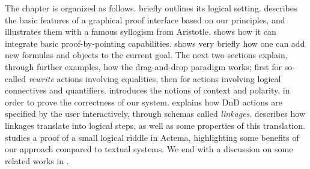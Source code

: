 The chapter is organized as follows.  briefly outlines
its logical setting.  describes the basic features of
a graphical proof interface based on our principles, and illustrates them with a
famous syllogism from Aristotle.  shows how it can
integrate basic proof-by-pointing capabilities.  shows
very briefly how one can add new formulas and objects to the current goal. The
next two sections explain, through further examples, how the drag-and-drop
paradigm works; first for so-called \emph{rewrite} actions involving equalities,
then for actions involving logical connectives and quantifiers.
 introduces the notions of context and polarity, in
order to prove the correctness of our system. 
explains how DnD actions are specified by the user interactively, through
schemas called \emph{linkages}.  describes how linkages
translate into logical steps, as well as some properties of this translation.
 studies a proof of a small logical riddle in Actema,
highlighting some benefits of our approach compared to textual systems. We end
with a discussion on some related works in .




